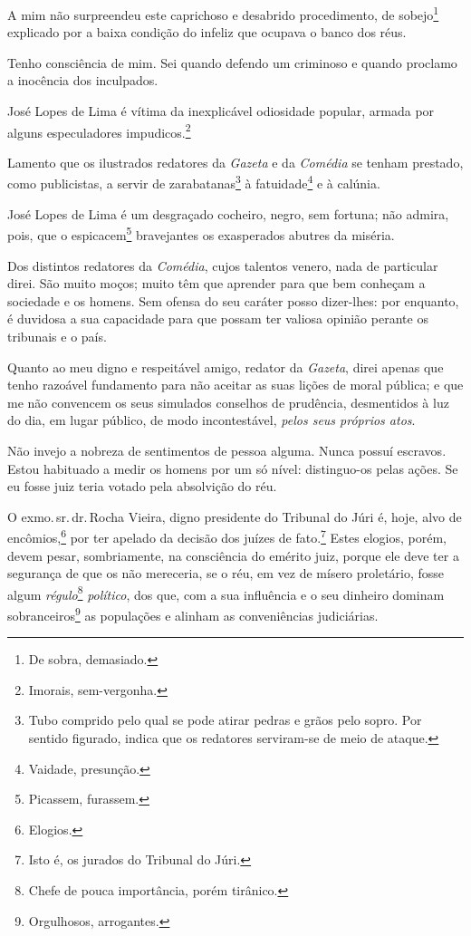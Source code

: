 A mim não surpreendeu este caprichoso e desabrido procedimento, de
sobejo\footnote{De sobra, demasiado.} explicado por a baixa condição
do infeliz que ocupava o banco dos réus.

Tenho consciência de mim. Sei quando defendo um criminoso e quando
proclamo a inocência dos inculpados.

José Lopes de Lima é vítima da inexplicável odiosidade popular, armada
por alguns especuladores impudicos.\footnote{Imorais, sem-vergonha.}

Lamento que os ilustrados redatores da \textit{Gazeta} e da \textit{Comédia}
se tenham prestado, como publicistas, a servir de zarabatanas\footnote{Tubo comprido pelo qual se pode atirar
    pedras e grãos pelo sopro. Por sentido figurado, indica que os
    redatores serviram-se de meio de ataque.} à fatuidade\footnote{
    Vaidade, presunção.} e à calúnia. 

José Lopes de Lima é um desgraçado cocheiro, negro, sem fortuna; não
admira, pois, que o espicacem\footnote{Picassem, furassem.}
bravejantes os exasperados abutres da miséria.

Dos distintos redatores da \textit{Comédia}, cujos talentos venero, nada
de particular direi. São muito moços; muito têm que aprender para que
bem conheçam a sociedade e os homens. Sem ofensa do seu caráter posso
dizer-lhes: por enquanto, é duvidosa a sua capacidade para que possam
ter valiosa opinião perante os tribunais e o país.

Quanto ao meu digno e respeitável amigo, redator da \textit{Gazeta}, direi
apenas que tenho razoável fundamento para não aceitar as suas lições de
moral pública; e que me não convencem os seus simulados conselhos de
prudência, desmentidos à luz do dia, em lugar público, de modo
incontestável, \emph{pelos seus próprios atos}.

Não invejo a nobreza de sentimentos de pessoa alguma. Nunca possuí
escravos. Estou habituado a medir os homens por um só nível:
distinguo-os pelas ações. Se eu fosse juiz teria votado pela absolvição
do réu.

O exmo.\,sr.\,dr.\,Rocha Vieira, digno presidente do Tribunal do Júri é,
hoje, alvo de encômios,\footnote{Elogios.} por ter apelado da decisão
dos juízes de fato.\footnote{Isto é, os jurados do Tribunal do Júri.}
Estes elogios, porém, devem pesar, sombriamente, na consciência do
emérito juiz, porque ele deve ter a segurança de que os não mereceria,
se o réu, em vez de mísero proletário, fosse algum
\emph{régulo}\footnote{Chefe de pouca importância, porém tirânico.}
\emph{político}, dos que, com a sua influência e o seu dinheiro dominam
sobranceiros\footnote{Orgulhosos, arrogantes.}
as populações e alinham as
conveniências judiciárias.

